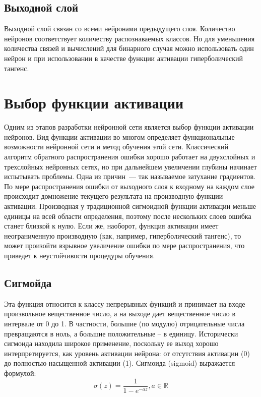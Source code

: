 \documentclass[11pt,colorlinks=true]{article}
\begin{document}
\subsection{Выходной слой}
Выходной слой связан со всеми нейронами предыдущего слоя. Количество нейронов соответствует количеству распознаваемых классов. Но для уменьшения количества связей и вычислений для бинарного случая можно использовать один нейрон и при использовании в качестве функции активации гиперболический тангенс. 

\section{Выбор функции активации}

Одним из этапов разработки нейронной сети является выбор функции активации нейронов. Вид функции активации во многом определяет функциональные возможности нейронной сети и метод обучения этой сети. Классический алгоритм обратного распространения ошибки хорошо работает на двухслойных и трехслойных нейронных сетях, но при дальнейшем увеличении глубины начинает испытывать проблемы. Одна из причин~— так называемое затухание градиентов. По мере распространения ошибки от выходного слоя к входному на каждом слое происходит домножение текущего результата на производную функции активации. Производная у традиционной сигмоидной функции активации меньше единицы на всей области определения, поэтому после нескольких слоев ошибка станет близкой к нулю. Если же, наоборот, функция активации имеет неограниченную производную (как, например, гиперболический тангенс), то может произойти взрывное увеличение ошибки по мере распространения, что приведет к неустойчивости процедуры обучения.

\subsection{Сигмойда}
Эта функция относится к классу непрерывных функций и принимает на входе произвольное вещественное число, а на выходе дает вещественное число в интервале от 0 до 1. В частности, большие (по модулю) отрицательные числа превращаются в ноль, а большие положительные – в единицу. Исторически сигмоида находила широкое применение, поскольку ее выход хорошо интерпретируется, как уровень активации нейрона: от отсутствия активации (0) до полностью насыщенной активации (1). Сигмоида (sigmoid) выражается формулой: 
\begin{equation*}
\sigma(z) = \frac{1}{1 - e^{-az}}, a \in \mathbb{R}
\end{equation*}
\end{document}

